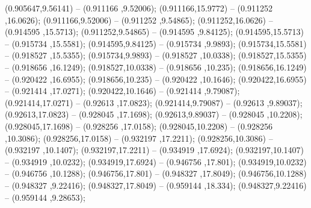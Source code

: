  (0.905647,9.56141) -- (0.911166 ,9.52006);
 (0.911166,15.9772) -- (0.911252 ,16.0626);
 (0.911166,9.52006) -- (0.911252 ,9.54865);
 (0.911252,16.0626) -- (0.914595 ,15.5713);
 (0.911252,9.54865) -- (0.914595 ,9.84125);
 (0.914595,15.5713) -- (0.915734 ,15.5581);
 (0.914595,9.84125) -- (0.915734 ,9.9893);
 (0.915734,15.5581) -- (0.918527 ,15.5355);
 (0.915734,9.9893) -- (0.918527 ,10.0338);
 (0.918527,15.5355) -- (0.918656 ,16.1249);
 (0.918527,10.0338) -- (0.918656 ,10.235);
 (0.918656,16.1249) -- (0.920422 ,16.6955);
 (0.918656,10.235) -- (0.920422 ,10.1646);
 (0.920422,16.6955) -- (0.921414 ,17.0271);
 (0.920422,10.1646) -- (0.921414 ,9.79087);
 (0.921414,17.0271) -- (0.92613 ,17.0823);
 (0.921414,9.79087) -- (0.92613 ,9.89037);
 (0.92613,17.0823) -- (0.928045 ,17.1698);
 (0.92613,9.89037) -- (0.928045 ,10.2208);
 (0.928045,17.1698) -- (0.928256 ,17.0158);
 (0.928045,10.2208) -- (0.928256 ,10.3086);
 (0.928256,17.0158) -- (0.932197 ,17.2211);
 (0.928256,10.3086) -- (0.932197 ,10.1407);
 (0.932197,17.2211) -- (0.934919 ,17.6924);
 (0.932197,10.1407) -- (0.934919 ,10.0232);
 (0.934919,17.6924) -- (0.946756 ,17.801);
 (0.934919,10.0232) -- (0.946756 ,10.1288);
 (0.946756,17.801) -- (0.948327 ,17.8049);
 (0.946756,10.1288) -- (0.948327 ,9.22416);
 (0.948327,17.8049) -- (0.959144 ,18.334);
 (0.948327,9.22416) -- (0.959144 ,9.28653);
